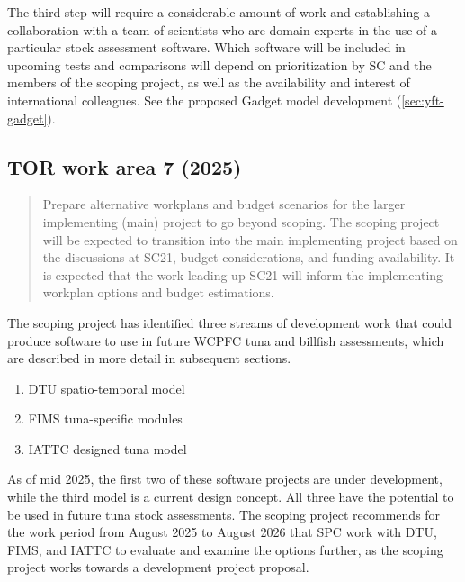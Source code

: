\documentclass{SCreport}
\begin{document}
\newpage

The third step will require a considerable amount of work and establishing a
collaboration with a team of scientists who are domain experts in the use of a
particular stock assessment software. Which software will be included in
upcoming tests and comparisons will depend on prioritization by SC and the
members of the scoping project, as well as the availability and interest of
international colleagues. See the proposed Gadget model development
(\autoref{sec:yft-gadget}).

\vspace{2ex}

\hypertarget{link:tor-7}{}
\subsection{TOR work area 7 (2025)}
\label{sec:tor-7}

\begin{quote}\sf
  Prepare alternative workplans and budget scenarios for the larger implementing
  (main) project to go beyond scoping. The scoping project will be expected to
  transition into the main implementing project based on the discussions at
  SC21, budget considerations, and funding availability. It is expected that the
  work leading up SC21 will inform the implementing workplan options and budget
  estimations.
\end{quote}

\vspace{2ex}

The scoping project has identified three streams of development work that could
produce software to use in future WCPFC tuna and billfish assessments, which are
described in more detail in subsequent sections.

\begin{enumerate}
  \item DTU spatio-temporal model\\[-4.5ex]
  \item FIMS tuna-specific modules\\[-4.5ex]
  \item IATTC designed tuna model
\end{enumerate}

As of mid 2025, the first two of these software projects are under development,
while the third model is a current design concept. All three have the potential
to be used in future tuna stock assessments. The scoping project recommends for
the work period from August 2025 to August 2026 that SPC work with DTU, FIMS,
and IATTC to evaluate and examine the options further, as the scoping project
works towards a development project proposal.
\end{document}
